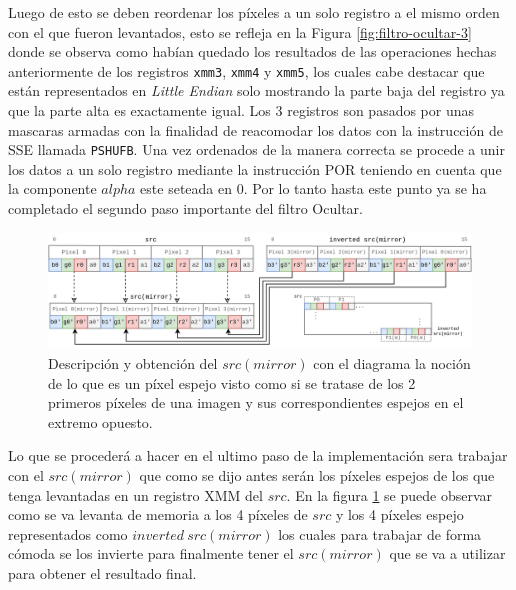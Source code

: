 \documentclass[a4paper]{article}
\begin{document}
Luego de esto se deben reordenar los píxeles a un solo registro a el mismo orden con el que fueron levantados, esto se refleja en la Figura \ref{fig:filtro-ocultar-3} donde se observa como habían quedado los resultados de las operaciones hechas anteriormente de los registros \texttt{xmm3}, \texttt{xmm4} y \texttt{xmm5}, los cuales cabe destacar que están representados en \emph{Little Endian} solo mostrando la parte baja del registro ya que la parte alta es exactamente igual.
Los 3 registros son pasados por unas mascaras armadas con la finalidad de reacomodar los datos con la instrucción de SSE llamada \texttt{PSHUFB}. Una vez ordenados de la manera correcta se procede a unir los datos a un solo registro mediante la instrucción POR teniendo en cuenta que la componente $alpha$ este seteada en $0$. Por lo tanto hasta este punto ya se ha completado el segundo paso importante del filtro Ocultar.


\begin{figure}[h]
  \begin{center}
	\includegraphics[scale=0.34]{images/filtro-ocultar-4.png}
	\caption{Descripción y obtención del $src(mirror)$ con el diagrama la noción de lo que es un píxel espejo visto como si se tratase de los 2 primeros píxeles de una imagen y sus correspondientes espejos en el extremo opuesto.}
	\label{fig:filtro-ocultar-4}
  \end{center}
\end{figure}

Lo que se procederá a hacer en el ultimo paso de la implementación sera trabajar con el $src(mirror)$ que como se dijo antes serán los píxeles espejos de los que tenga levantadas en un registro XMM del $src$. En la figura \ref{fig:filtro-ocultar-4} se puede observar como se va levanta de memoria a los 4 píxeles de $src$ y los 4 píxeles espejo representados como $inverted\ src(mirror)$ los cuales para trabajar de forma cómoda se los invierte para finalmente tener el $src(mirror)$ que se va a utilizar para obtener el resultado final.
\end{document}
